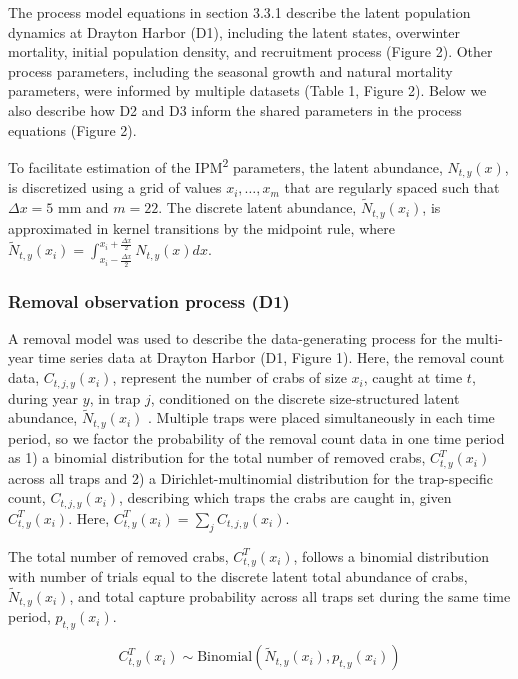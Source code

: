 \documentclass{article}
\begin{document}
The process model equations in section 3.3.1 describe the latent population dynamics at Drayton Harbor (D1), including the latent states, overwinter mortality, initial population density, and recruitment process (Figure 2). Other process parameters, including the seasonal growth and natural mortality parameters, were informed by multiple datasets (Table 1, Figure 2). Below we also describe how D2 and D3 inform the shared parameters in the process equations (Figure 2).

To facilitate estimation of the IPM\textsuperscript{2} parameters, the latent abundance, $N_{t,y}(x)$, is discretized using a grid of values $x_i , \ldots, x_m$ that are regularly spaced such that $\Delta x = 5$ mm and $m = 22$. The discrete latent abundance, $\tilde{N}_{t,y}(x_i)$, is approximated in kernel transitions by the midpoint rule, where $\tilde{N}_{t,y}(x_i) = \int_{x_i - \frac{\Delta x}{2}}^{x_i + \frac{\Delta x}{2}}N_{t,y}(x)dx$.

\subsubsection*{Removal observation process (D1)}

A removal model was used to describe the data-generating process for the multi-year time series data at Drayton Harbor (D1, Figure 1). Here, the removal count data, $C_{t,j,y}(x_i)$, represent the number of crabs of size $x_i$, caught at time $t$, during year $y$, in trap $j$, conditioned on the discrete size-structured latent abundance, $\tilde{N}_{t,y}(x_i)$ \parencite{kery2015modeling}. Multiple traps were placed simultaneously in each time period, so we factor the probability of the removal count data in one time period as 1) a binomial distribution for the total number of removed crabs, $C^T_{t,y}(x_i)$ across all traps and 2) a Dirichlet-multinomial distribution for the trap-specific count, $C_{t,j,y}(x_i)$, describing which traps the crabs are caught in, given $C^T_{t,y}(x_i)$. Here, $C^T_{t,y}(x_i) = \sum_jC_{t,j,y}(x_i)$. 

The total number of removed crabs, $C^T_{t,y}(x_i)$, follows a binomial distribution with number of trials equal to the discrete latent total abundance of crabs, $\tilde{N}_{t,y}(x_i)$, and total capture probability across all traps set during the same time period, $p_{t,y}(x_i)$.

\begin{equation}
C^T_{t,y}(x_i) \sim \text{Binomial}(\tilde{N}_{t,y}(x_i), p_{t,y}(x_i))
\end{equation}
\end{document}
